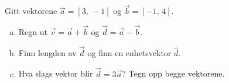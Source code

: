 %
Gitt vektorene $\vec{a} = [3,\,-1]$ og $\vec{b} = [-1,\,4]$.
\begin{enumerate}[a)]
    \item Regn ut $\vec{c}=\vec{a} + \vec{b}$ og $\vec{d}=\vec{a} - \vec{b}$.
    \item Finn lengden av $\vec{d}$ og finn en enhetsvektor $\hat{d}$.
    \item Hva slags vektor blir $\vec{d}=3\vec{a}$? Tegn opp begge vektorene. 
\end{enumerate}
